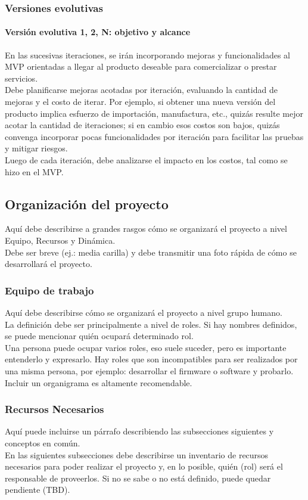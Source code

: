 \subsubsection{Versiones evolutivas}
\paragraph{Versión evolutiva 1, 2, N: objetivo y alcance}
{\consigna
En las sucesivas iteraciones, se irán incorporando mejoras y funcionalidades al MVP orientadas a llegar al producto deseable para comercializar o prestar servicios.\\
Debe planificarse mejoras acotadas por iteración, evaluando la cantidad de mejoras y el costo de iterar. Por ejemplo, si obtener una nueva versión del producto implica esfuerzo de importación, manufactura, etc., quizás resulte mejor acotar la cantidad de iteraciones; si en cambio esos costos son bajos, quizás convenga incorporar pocas funcionalidades por iteración para facilitar las pruebas y mitigar riesgos.\\
Luego de cada iteración, debe analizarse el impacto en los costos, tal como se hizo en el MVP.
}


\subsection{Organización del proyecto}
{\consigna
Aquí debe describirse a grandes rasgos cómo se organizará el proyecto a nivel Equipo, Recursos y Dinámica.\\
Debe ser breve (ej.: media carilla) y debe transmitir una foto rápida de cómo se desarrollará el proyecto.
}
\subsubsection{Equipo de trabajo}
{\consigna
Aquí debe describirse cómo se organizará el proyecto a nivel grupo humano.\\
La definición debe ser principalmente a nivel de roles. Si hay nombres definidos, se puede mencionar quién ocupará determinado rol.\\
Una persona puede ocupar varios roles, eso suele suceder, pero es importante entenderlo y expresarlo. Hay roles que son incompatibles para ser realizados por una misma persona, por ejemplo: desarrollar el firmware o software y probarlo.\\
Incluir un organigrama es altamente recomendable.
}
\subsubsection{Recursos Necesarios}
{\consigna
Aquí puede incluirse un párrafo describiendo las subsecciones siguientes y conceptos en común.\\
En las siguientes subsecciones debe describirse un inventario de recursos necesarios para poder realizar el proyecto y, en lo posible, quién (rol) será el responsable de proveerlos. Si no se sabe o no está definido, puede quedar pendiente (TBD).
}
